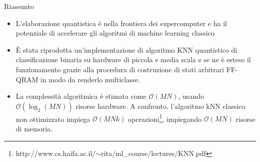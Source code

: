 \documentclass{beamer}
\begin{document}
    \begin{frame}{Riassunto}
        \begin{itemize}
            \item L'elaborazione quantistica è nella frontiera dei supercomputer e ha il potenziale di accelerare gli algoritmi di machine learning classico
            \item È stata riprodotta un'implementazione di algoritmo KNN quantistico di classificazione binaria su hardware di piccola e media scala e 
            se ne è esteso il funzionamento grazie alla procedura di costruzione di stati arbitrari FF-QRAM in modo da renderlo multiclasse. 
            \item La complessità algoritmica è stimata come $\mathcal{O}(MN)$, usando $\mathcal{O}(\log_2(MN))$ risorse hardware. 
            A confronto, l'algoritmo kNN classico non ottimizzato impiega $\mathcal{O}(MNk)$ operazioni\footnote{http://www.cs.haifa.ac.il/$\sim$rita/ml\_course/lectures/KNN.pdf}, impiegando $\mathcal{O}(MN)$ risorse di memoria. 
        \end{itemize}
    \end{frame}
\end{document}

